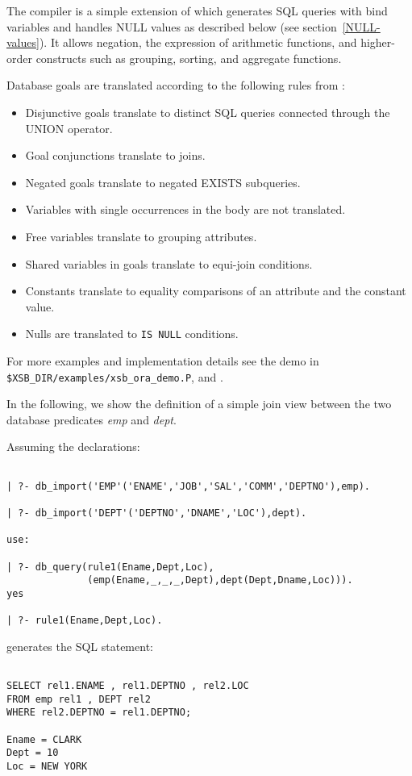 The compiler is a simple extension of \cite{Drax92} which generates SQL
queries with bind variables and handles NULL values as described below
(see section~\ref{NULL-values}).  It allows negation, the expression of
arithmetic functions, and higher-order constructs such as grouping,
sorting, and aggregate functions.

Database goals are translated according to the following rules
from \cite{Drax92}:
\begin{itemize}
\item Disjunctive goals translate to distinct SQL queries
	connected through the UNION operator.
\item Goal conjunctions translate to joins.
\item Negated goals translate to negated EXISTS subqueries.
\item Variables with single occurrences in the body are not
	  translated.
\item Free variables translate to grouping attributes.
\item Shared variables in goals translate to equi-join conditions.
\item Constants translate to equality comparisons of an attribute and
	  the constant value.
\item Nulls are translated to {\tt IS NULL} conditions.
\end{itemize}
For more examples and implementation details see the demo in 
{\tt \$XSB\_DIR/examples/xsb\_ora\_demo.P}, and \cite{Drax92}.
 
In the following, we show the definition of a simple join view between the 
two database predicates {\it emp} and {\it dept}.

Assuming the declarations:
\begin{verbatim}

| ?- db_import('EMP'('ENAME','JOB','SAL','COMM','DEPTNO'),emp).

| ?- db_import('DEPT'('DEPTNO','DNAME','LOC'),dept).

use:
	
| ?- db_query(rule1(Ename,Dept,Loc),
	          (emp(Ename,_,_,_,Dept),dept(Dept,Dname,Loc))).
yes

| ?- rule1(Ename,Dept,Loc).
\end{verbatim}

generates the SQL statement:
\begin{verbatim}

SELECT rel1.ENAME , rel1.DEPTNO , rel2.LOC
FROM emp rel1 , DEPT rel2
WHERE rel2.DEPTNO = rel1.DEPTNO;

Ename = CLARK
Dept = 10
Loc = NEW YORK
\end{verbatim}

